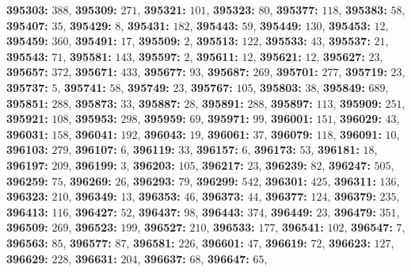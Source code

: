 \textsf{\bfseries 395303:} $388$, \textsf{\bfseries 395309:} $271$, \textsf{\bfseries 395321:} $101$, \textsf{\bfseries 395323:} $80$, \textsf{\bfseries 395377:} $118$, \textsf{\bfseries 395383:} $58$, \textsf{\bfseries 395407:} $35$, \textsf{\bfseries 395429:} $8$, \textsf{\bfseries 395431:} $182$, \textsf{\bfseries 395443:} $59$, \textsf{\bfseries 395449:} $130$, \textsf{\bfseries 395453:} $12$, \textsf{\bfseries 395459:} $360$, \textsf{\bfseries 395491:} $17$, \textsf{\bfseries 395509:} $2$, \textsf{\bfseries 395513:} $122$, \textsf{\bfseries 395533:} $43$, \textsf{\bfseries 395537:} $21$, \textsf{\bfseries 395543:} $71$, \textsf{\bfseries 395581:} $143$, \textsf{\bfseries 395597:} $2$, \textsf{\bfseries 395611:} $12$, \textsf{\bfseries 395621:} $12$, \textsf{\bfseries 395627:} $23$, \textsf{\bfseries 395657:} $372$, \textsf{\bfseries 395671:} $433$, \textsf{\bfseries 395677:} $93$, \textsf{\bfseries 395687:} $269$, \textsf{\bfseries 395701:} $277$, \textsf{\bfseries 395719:} $23$, \textsf{\bfseries 395737:} $5$, \textsf{\bfseries 395741:} $58$, \textsf{\bfseries 395749:} $23$, \textsf{\bfseries 395767:} $105$, \textsf{\bfseries 395803:} $38$, \textsf{\bfseries 395849:} $689$, \textsf{\bfseries 395851:} $288$, \textsf{\bfseries 395873:} $33$, \textsf{\bfseries 395887:} $28$, \textsf{\bfseries 395891:} $288$, \textsf{\bfseries 395897:} $113$, \textsf{\bfseries 395909:} $251$, \textsf{\bfseries 395921:} $108$, \textsf{\bfseries 395953:} $298$, \textsf{\bfseries 395959:} $69$, \textsf{\bfseries 395971:} $99$, \textsf{\bfseries 396001:} $151$, \textsf{\bfseries 396029:} $43$, \textsf{\bfseries 396031:} $158$, \textsf{\bfseries 396041:} $192$, \textsf{\bfseries 396043:} $19$, \textsf{\bfseries 396061:} $37$, \textsf{\bfseries 396079:} $118$, \textsf{\bfseries 396091:} $10$, \textsf{\bfseries 396103:} $279$, \textsf{\bfseries 396107:} $6$, \textsf{\bfseries 396119:} $33$, \textsf{\bfseries 396157:} $6$, \textsf{\bfseries 396173:} $53$, \textsf{\bfseries 396181:} $18$, \textsf{\bfseries 396197:} $209$, \textsf{\bfseries 396199:} $3$, \textsf{\bfseries 396203:} $105$, \textsf{\bfseries 396217:} $23$, \textsf{\bfseries 396239:} $82$, \textsf{\bfseries 396247:} $505$, \textsf{\bfseries 396259:} $75$, \textsf{\bfseries 396269:} $26$, \textsf{\bfseries 396293:} $79$, \textsf{\bfseries 396299:} $542$, \textsf{\bfseries 396301:} $425$, \textsf{\bfseries 396311:} $136$, \textsf{\bfseries 396323:} $210$, \textsf{\bfseries 396349:} $13$, \textsf{\bfseries 396353:} $46$, \textsf{\bfseries 396373:} $44$, \textsf{\bfseries 396377:} $124$, \textsf{\bfseries 396379:} $235$, \textsf{\bfseries 396413:} $116$, \textsf{\bfseries 396427:} $52$, \textsf{\bfseries 396437:} $98$, \textsf{\bfseries 396443:} $374$, \textsf{\bfseries 396449:} $23$, \textsf{\bfseries 396479:} $351$, \textsf{\bfseries 396509:} $269$, \textsf{\bfseries 396523:} $199$, \textsf{\bfseries 396527:} $210$, \textsf{\bfseries 396533:} $177$, \textsf{\bfseries 396541:} $102$, \textsf{\bfseries 396547:} $7$, \textsf{\bfseries 396563:} $85$, \textsf{\bfseries 396577:} $87$, \textsf{\bfseries 396581:} $226$, \textsf{\bfseries 396601:} $47$, \textsf{\bfseries 396619:} $72$, \textsf{\bfseries 396623:} $127$, \textsf{\bfseries 396629:} $228$, \textsf{\bfseries 396631:} $204$, \textsf{\bfseries 396637:} $68$, \textsf{\bfseries 396647:} $65$, 
